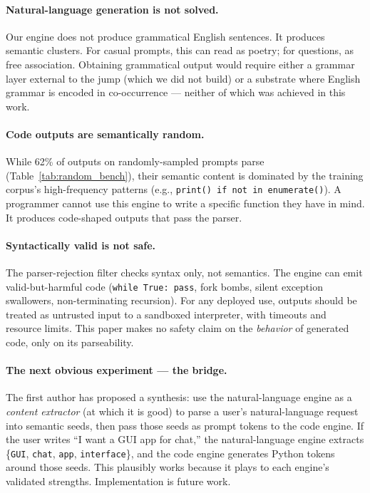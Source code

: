 \documentclass[11pt,a4paper]{article}
\begin{document}
\paragraph{Natural-language generation is not solved.} Our engine does not produce grammatical English sentences. It produces semantic clusters. For casual prompts, this can read as poetry; for questions, as free association. Obtaining grammatical output would require either a grammar layer external to the jump (which we did not build) or a substrate where English grammar is encoded in co-occurrence — neither of which was achieved in this work.

\paragraph{Code outputs are semantically random.} While 62\% of outputs on randomly-sampled prompts parse (Table~\ref{tab:random_bench}), their semantic content is dominated by the training corpus's high-frequency patterns (e.g., \texttt{print() if not in enumerate()}). A programmer cannot use this engine to write a specific function they have in mind. It produces code-shaped outputs that pass the parser.

\paragraph{Syntactically valid is not safe.} The parser-rejection filter checks syntax only, not semantics. The engine can emit valid-but-harmful code (\texttt{while True: pass}, fork bombs, silent exception swallowers, non-terminating recursion). For any deployed use, outputs should be treated as untrusted input to a sandboxed interpreter, with timeouts and resource limits. This paper makes no safety claim on the \emph{behavior} of generated code, only on its parseability.

\paragraph{The next obvious experiment — the bridge.} The first author has proposed a synthesis: use the natural-language engine as a \emph{content extractor} (at which it is good) to parse a user's natural-language request into semantic seeds, then pass those seeds as prompt tokens to the code engine. If the user writes ``I want a GUI app for chat,'' the natural-language engine extracts \{\texttt{GUI}, \texttt{chat}, \texttt{app}, \texttt{interface}\}, and the code engine generates Python tokens around those seeds. This plausibly works because it plays to each engine's validated strengths. Implementation is future work.
\end{document}
